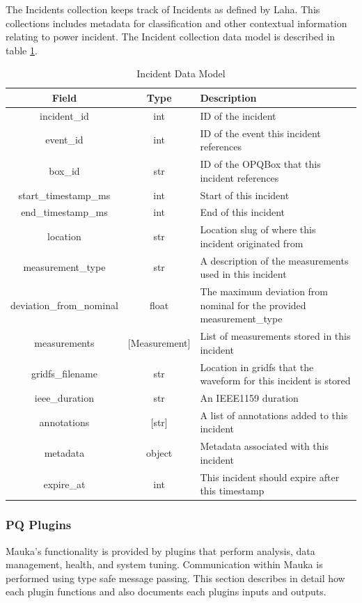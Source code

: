 The Incidents collection keeps track of Incidents as defined by Laha. This collections includes metadata for classification and other contextual information relating to power incident. The Incident collection data model is described in table \ref{table:Incidents}.

\begin{table}[H]
	\centering
	\caption{Incident Data Model}
	\begin{tabular}{|c|c|p{8cm}|}
		\hline 
		Field & Type & Description \\ 
		\hline
		incident\_id & int & ID of the incident \\
		\hline
		event\_id & int & ID of the event this incident references \\
		\hline
		box\_id & str & ID of the OPQBox that this incident references \\
		\hline
		start\_timestamp\_ms & int & Start of this incident \\
		\hline
		end\_timestamp\_ms & int & End of this incident \\
		\hline
		location & str & Location slug of where this incident originated from \\
		\hline
		measurement\_type & str & A description of the measurements used in this incident \\
		\hline
		deviation\_from\_nominal & float & The maximum deviation from nominal for the provided measurement\_type \\
		\hline
		measurements & [Measurement] & List of measurements stored in this incident \\
		\hline
		gridfs\_filename & str & Location in gridfs that the waveform for this incident is stored \\
		\hline
		ieee\_duration & str & An IEEE1159 duration \\
		\hline
		annotations & [str] & A list of annotations added to this incident \\
		\hline
		metadata & object & Metadata associated with this incident \\
		\hline
		expire\_at & int & This incident should expire after this timestamp \\
		\hline
	\end{tabular} 
	\label{table:Incidents}
\end{table}

\subsubsection{PQ Plugins}
Mauka's functionality is provided by plugins that perform analysis, data management, health, and system tuning. Communication within Mauka is performed using type safe message passing. This section describes in detail how each plugin functions and also documents each plugins inputs and outputs.

